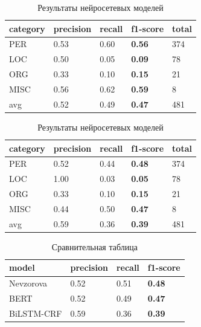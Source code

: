 \hfill
\begin{table}[h!]
\label{table:res}
\begin{subtable}[h]{0.4\textwidth}

\begin{tabular}{| l | l | l | l | l |}
\hline

 category &precision  &  recall & \textbf{f1-score} &  total\\
\hline
PER &  0.53 & 0.60 & \textbf{0.56} &  374 \\ 
\hline
LOC &  0.50 & 0.05 & \textbf{0.09} &   78 \\ 
\hline
ORG &  0.33 & 0.10 & \textbf{0.15} &   21 \\
\hline
MISC &  0.56 & 0.62 & \textbf{0.59} &   8 \\
\hline
\hline

avg &  0.52 & 0.49 & \textbf{0.47} &  481 \\
\hline
\end{tabular}

\caption{Результаты модели BERT}
\end{subtable}

\hfill

\begin{subtable}[h]{0.4\textwidth}

\begin{tabular}{| l | l | l | l | l |}
\hline

 category &precision  &  recall & \textbf{f1-score} &  total\\
\hline
PER &  0.52 & 0.44 & \textbf{0.48} &  374 \\ 
\hline
LOC &  1.00 & 0.03 & \textbf{0.05} &   78 \\ 
\hline
ORG &  0.33 & 0.10 & \textbf{0.15} &   21 \\
\hline
MISC &  0.44 & 0.50 & \textbf{0.47} &   8 \\
\hline
\hline

avg &  0.59 & 0.36 & \textbf{0.39} &  481 \\
\hline
\end{tabular}

\caption{Результаты модели Bi-LSTM-CRF}
\end{subtable}
\caption{Результаты нейросетевых моделей}

\end{table}


\begin{table}[h!]

\begin{tabular}{| l | l | l | l |}
\hline

model &precision  &  recall & \textbf{f1-score} \\
\hline
Nevzorova & 0.52 & 0.51& \textbf{0.48} \\ 
\hline
BERT &  0.52 & 0.49 & \textbf{0.47} \\ 
\hline
BiLSTM-CRF &  0.59 & 0.36 & \textbf{0.39} \\
\hline
\end{tabular}

\caption{Сравнительная таблица}
\label{table:average}

\end{table}

